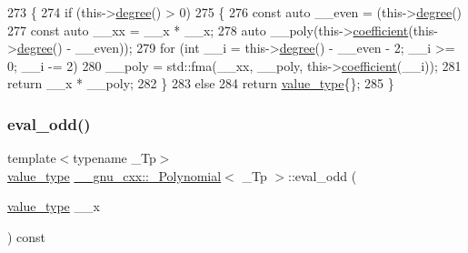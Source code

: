 \begin{DoxyCode}
273     \{
274       \textcolor{keywordflow}{if} (this->\hyperlink{class____gnu__cxx_1_1__Polynomial_a07d9933aeeb9afbd823218ed921336cb}{degree}() > 0)
275         \{
276           \textcolor{keyword}{const} \textcolor{keyword}{auto} \_\_even = (this->\hyperlink{class____gnu__cxx_1_1__Polynomial_a07d9933aeeb9afbd823218ed921336cb}{degree}() %
277           \textcolor{keyword}{const} \textcolor{keyword}{auto} \_\_xx = \_\_x * \_\_x;
278           \textcolor{keyword}{auto} \_\_poly(this->\hyperlink{class____gnu__cxx_1_1__Polynomial_a7cee31b3acbe8c024af6d696bc610f49}{coefficient}(this->\hyperlink{class____gnu__cxx_1_1__Polynomial_a07d9933aeeb9afbd823218ed921336cb}{degree}() - \_\_even));
279           \textcolor{keywordflow}{for} (\textcolor{keywordtype}{int} \_\_i = this->\hyperlink{class____gnu__cxx_1_1__Polynomial_a07d9933aeeb9afbd823218ed921336cb}{degree}() - \_\_even - 2; \_\_i >= 0; \_\_i -= 2)
280             \_\_poly = std::fma(\_\_xx, \_\_poly, this->\hyperlink{class____gnu__cxx_1_1__Polynomial_a7cee31b3acbe8c024af6d696bc610f49}{coefficient}(\_\_i));
281           \textcolor{keywordflow}{return} \_\_x * \_\_poly;
282         \}
283       \textcolor{keywordflow}{else}
284         \textcolor{keywordflow}{return} \hyperlink{class____gnu__cxx_1_1__Polynomial_a725563351f50e76084a7a016c06f8a53}{value\_type}\{\};
285     \}
\end{DoxyCode}
\mbox{\label{class____gnu__cxx_1_1__Polynomial_aff02472cad1aa3b6c8d067fdd4b11bc0}} 
\subsubsection{\texorpdfstring{eval\+\_\+odd()}{eval\_odd()}\hspace{0.1cm}{\footnotesize\ttfamily [2/3]}}
{\footnotesize\ttfamily template$<$typename \+\_\+\+Tp$>$ \\
\hyperlink{class____gnu__cxx_1_1__Polynomial_a725563351f50e76084a7a016c06f8a53}{value\+\_\+type} \hyperlink{class____gnu__cxx_1_1__Polynomial}{\+\_\+\+\_\+gnu\+\_\+cxx\+::\+\_\+\+Polynomial}$<$ \+\_\+\+Tp $>$\+::eval\+\_\+odd (\begin{DoxyParamCaption}\item[{\hyperlink{class____gnu__cxx_1_1__Polynomial_a725563351f50e76084a7a016c06f8a53}{value\+\_\+type}}]{\+\_\+\+\_\+x }\end{DoxyParamCaption}) const}

